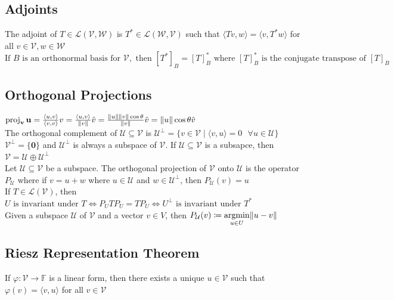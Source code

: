 \documentclass{article}
\DeclarePairedDelimiter\norm{\lVert}{\rVert}%
\DeclareMathOperator{\PProjection}{proj}
\DeclareMathOperator*{\argmin}{argmin}
\newcommand{\F}{\mathbb{F}}
\newcommand{\linear}{\mathcal{L}}
\newcommand{\U}{\mathcal{U}}
\newcommand{\V}{\mathcal{V}}
\newcommand{\W}{\mathcal{W}}
\newcommand\inner[2]{\langle #1, #2 \rangle}
\newcommand{\vct}{\mathbf}
\newcommand{\PProj}[2][]{\PProjection_{\vct{#1}}\vct{#2}}
\begin{document}
\subsection{Adjoints}
The adjoint of $T \in \linear(\V, \W)$ is $T^* \in \linear(\W, \V)$ such that $\inner{Tv}{w} = \inner{v}{T^*w}$ for all $v \in \V, w \in \W$ \\
$\mbox{If } B \mbox { is an orthonormal basis for }\V, \mbox{ then }[T^*]_B = [T]_B^* \mbox{ where } [T]_B^* \mbox{ is the conjugate transpose of } [T]_B$

\subsection{Orthogonal Projections}
$\PProj[v] {u} = \frac{\inner{u}{v}}{\inner{v}{v}} v = \frac{\inner{u}{v}}{\norm{v}}\hat{v} = \frac{\norm u \norm v \cos \theta}{{\norm v}} \hat v = \norm u \cos \theta \hat{v}$ \\
The orthogonal complement of $\U \subseteq \V$ is $\U^{\perp} = \{v \in \V \mid \inner{v}{u} = 0 \mbox{ }\forall u \in \U \}$ \\
$\V^{\perp} = \{\boldsymbol{0}\}$ and $\U^{\perp}$ is always a subspace of $\V$. If $\U \subseteq \V$ is a subsapce, then $\V = \U \oplus \U^{\perp}$ \\
Let $\U \subseteq \V$ be a subspace. The orthogonal projection of $\V$ onto $\U$ is the operator $P_{\U}$ where if $v = u + w$ where $u \in \U$ and $w \in \U^{\perp}$, then $P_{\U}(v) = u$ \\
If $T \in \linear(\V)$, then $U\mbox{ is invariant under }T \iff P_UTP_U = TP_U \iff U^\perp \mbox{ is invariant under }T^*$ \\
Given a subspace $\U$ of $\V$ and a vector $v \in V$, then $P_{\U}(v) \coloneqq \argmin\limits_{u \in U} \norm{u - v}$ 


\subsection{Riesz Representation Theorem}
If $\varphi: \V \rightarrow \F$ is a linear form, then there exists a unique $u \in \V$ such that $\varphi(v) = \inner v u$ for all $v \in \V$
\end{document}
